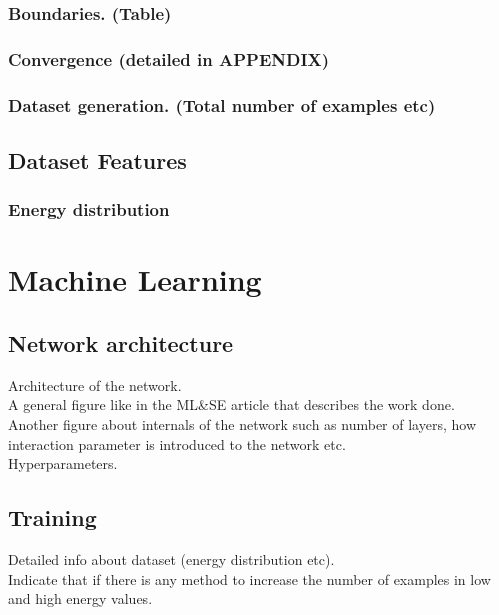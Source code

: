 \documentclass[a4paper,times,hidelinks,12pt]{article}
\begin{document}
\subsubsection{Boundaries. (Table)}
\subsubsection{Convergence (detailed in APPENDIX)}
\subsubsection{Dataset generation. (Total number of examples etc)}

\subsection{Dataset Features}
\subsubsection{Energy distribution}

%		


\section{Machine Learning}
\subsection{Network architecture}
\noindent Architecture of the network.\\
    A general figure like in the ML\&SE article that describes the work done.\\
    Another figure about internals of the network such as number of layers, how interaction parameter is introduced to the network etc.\\
    Hyperparameters.\\
\subsection{Training}
\noindent    Detailed info about dataset (energy distribution etc).\\
    Indicate that if there is any method to increase the number of examples in low and high energy values.
\end{document}
